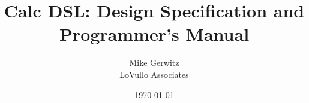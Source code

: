 \documentclass[10pt]{book}
\author{Mike Gerwitz\\LoVullo Associates}
\date{\today}
\begin{document}
\title{Calc DSL: Design Specification and Programmer's Manual}
\maketitle

\tableofcontents


\end{document}
